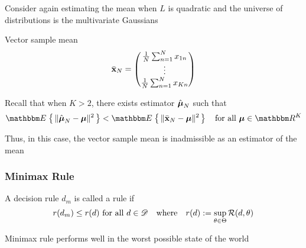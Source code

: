 \begin{frame}

    \vspace{2em}
    \Eg
    Consider again estimating the mean when $L$ is quadratic and the
    universe of distributions is the multivariate Gaussians
    
    Vector sample mean
    \begin{equation*}
    \bar {{\mathbf x}}_N 
    =
    \begin{pmatrix}
        \frac{1}{N} \sum_{n=1}^N x_{1n}
        \\
        \vdots
        \\
        \frac{1}{N} \sum_{n=1}^N x_{Kn}
    \end{pmatrix}
    \end{equation*}
    
    Recall that when $K > 2$,  there exists estimator
    $\hat {\boldsymbol \mu}_N$ such that
    \begin{equation}
        \EE \left\{ \, \| \hboldmu_N - \boldmu \|^2 \,  \right\}
        < \EE \left\{ \, \| \bar \boldx_N - \boldmu \|^2 \,  \right\}
        \quad
        \text{for all } \boldmu \in \RR^K
    \end{equation}
    
    Thus, in this case, the vector sample mean is inadmissible as an estimator of the mean
    
\end{frame}

\begin{frame}\frametitle{Minimax Rule}
    
    \vspace{2em}
    A decision rule $d_m$ is called a  rule if
    \begin{equation*}
        r(d_m) \leq r(d) 
        \text{ for all } d \in \mathscr D
        \quad \text{where} \quad
        r(d) := \sup_{\theta \in \Theta} \mathcal R(d, \theta)
    \end{equation*}
    
    \vspace{.7em}
    Minimax rule performs well in the worst possible state of the
    world
 
\end{frame}

